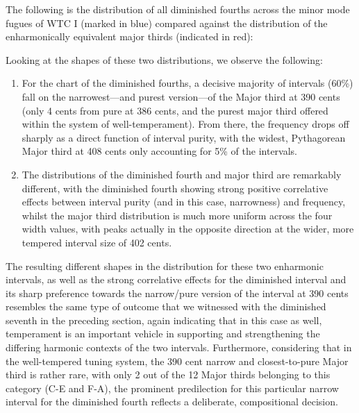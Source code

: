 The following is the distribution of all diminished fourths across the
minor mode fugues of WTC I (marked in blue) compared against the
distribution of the enharmonically equivalent major thirds (indicated in
red):


    \begin{center}
    \end{center}
    
    Looking at the shapes of these two distributions, we observe the
following:

\begin{enumerate}
\def\labelenumi{\arabic{enumi}.}
\tightlist
\item
  For the chart of the diminished fourths, a decisive majority of
  intervals (60\%) fall on the narrowest---and purest
  version---of the Major third at 390 cents (only 4 cents from pure
  at 386 cents, and the purest major third offered within the system of
  well-temperament). From there, the frequency drops off sharply as a
  direct function of interval purity, with the widest, Pythagorean Major
  third at 408 cents only accounting for 5\% of the intervals.
\item
  The distributions of the diminished fourth and major third are
  remarkably different, with the diminished fourth showing strong
  positive correlative effects between interval purity (and in this
  case, narrowness) and frequency, whilst the major third distribution
  is much more uniform across the four width values, with peaks actually
  in the opposite direction at the wider, more tempered interval size of
  402 cents.
\end{enumerate}

The resulting different shapes in the distribution for these two
enharmonic intervals, as well as the strong correlative effects for the
diminished interval and its sharp preference towards the narrow/pure
version of the interval at 390 cents resembles the same type of outcome
that we witnessed with the diminished seventh in the preceding section,
again indicating that in this case as well, temperament is an important
vehicle in supporting and strengthening the differing harmonic contexts
of the two intervals. Furthermore, considering that in the well-tempered
tuning system, the 390 cent narrow and closest-to-pure Major third is
rather rare, with only 2 out of the 12 Major thirds belonging to this
category (C-E and F-A), the prominent predilection for this particular
narrow interval for the diminished fourth reflects a deliberate,
compositional decision.


